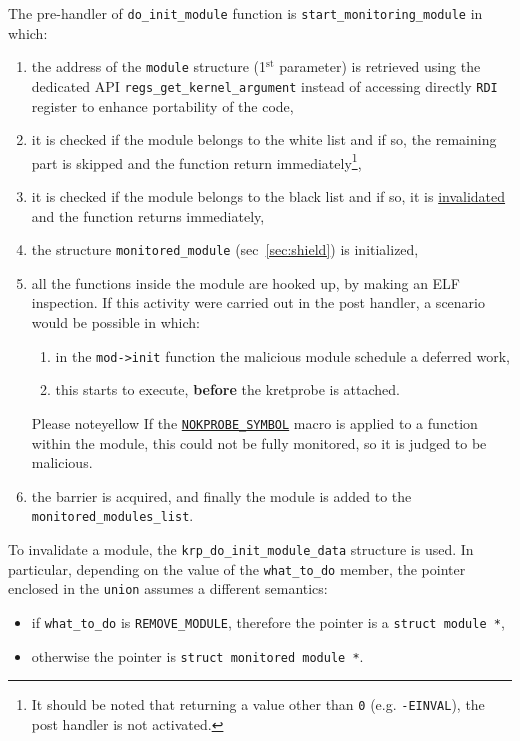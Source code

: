 \documentclass{article}
\begin{document}
	The pre-handler of \texttt{do\_init\_module} function is \texttt{start\_monitoring\_module} in which:
	\begin{enumerate}
		\item the address of the \texttt{module} structure (1$^{\text{st}}$ parameter) is retrieved using the dedicated
		API \texttt{regs\_get\_kernel\_argument} instead of accessing directly \texttt{RDI} register to enhance
		portability of the code,
		\item it is checked if the module belongs to the white list and if so, the remaining part is skipped
		and the function return immediately\footnote{It should be noted that returning a value other than \texttt{0}
		(e.g. \texttt{-EINVAL}), the post handler is not activated.},
		\item it is checked if the module belongs to the black list and if so, it is \ul{invalidated} and the function
		returns immediately,
		\item the structure \texttt{monitored\_module} (sec~\ref{sec:shield}) is initialized,
		\item all the functions inside the module are hooked up, by making an ELF inspection. If this activity were carried out in the post handler,
		a scenario would be possible in which:
		\begin{enumerate}
			\item in the \texttt{mod->init} function the malicious module schedule a deferred work,
			\item this starts to execute, \textbf{before} the kretprobe is attached.
		\end{enumerate}

		\begin{custombox}{Please note}{yellow}
			If the
			\href{https://elixir.bootlin.com/linux/v5.17/source/include/asm-generic/kprobes.h#L15}{\texttt{NOKPROBE\_SYMBOL}}
			macro is applied to a function within the module, this could not be fully monitored, so it is judged
			to be malicious.
		\end{custombox}
		\item the barrier is acquired, and finally the module is added to the \texttt{monitored\_modules\_list}.
	\end{enumerate}

	To invalidate a module, the \texttt{krp\_do\_init\_module\_data} structure is used. In particular, depending on the
	value of the \texttt{what\_to\_do} member, the pointer enclosed in the \texttt{union} assumes a different semantics:
	\begin{itemize}
		\item if \texttt{what\_to\_do} is \texttt{REMOVE\_MODULE}, therefore the pointer is a \texttt{struct module *},
		\item otherwise the pointer is \texttt{struct monitored module *}.
	\end{itemize}
\end{document}
